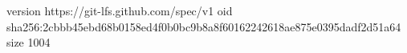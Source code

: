 version https://git-lfs.github.com/spec/v1
oid sha256:2cbbb45ebd68b0158ed4f0b0bc9b8a8f60162242618ae875e0395dadf2d51a64
size 1004
